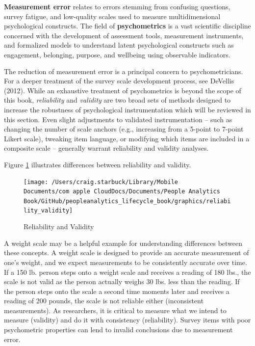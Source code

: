\documentclass[]{book}
\begin{document}
\textbf{Measurement error} relates to errors stemming from confusing questions, survey fatigue, and low-quality scales used to measure multidimensional psychological constructs. The field of \textbf{psychometrics} is a vast scientific discipline concerned with the development of assessment tools, measurement instruments, and formalized models to understand latent psychological constructs such as engagement, belonging, purpose, and wellbeing using observable indicators.

The reduction of measurement error is a principal concern to psychometricians. For a deeper treatment of the survey scale development process, see DeVellis (2012). While an exhaustive treatment of psychometrics is beyond the scope of this book, \emph{reliability} and \emph{validity} are two broad sets of methods designed to increase the robustness of psychological instrumentation which will be reviewed in this section. Even slight adjustments to validated instrumentation -- such as changing the number of scale anchors (e.g., increasing from a 5-point to 7-point Likert scale), tweaking item language, or modifying which items are included in a composite scale -- generally warrant reliability and validity analyses.

Figure \ref{fig:reli-vali} illustrates differences between reliability and validity.

\begin{figure}

{\centering \texttt{[image: /Users/craig.starbuck/Library/Mobile Documents/com~apple~CloudDocs/Documents/People Analytics Book/GitHub/peopleanalytics\_lifecycle\_book/graphics/reliability\_validity]} 

}

\caption{Reliability and Validity}\label{fig:reli-vali}
\end{figure}

A weight scale may be a helpful example for understanding differences between these concepts. A weight scale is designed to provide an accurate measurement of one's weight, and we expect measurements to be consistently accurate over time. If a 150 lb. person steps onto a weight scale and receives a reading of 180 lbs., the scale is not valid as the person actually weighs 30 lbs. less than the reading. If the person steps onto the scale a second time moments later and receives a reading of 200 pounds, the scale is not reliable either (inconsistent measurements). As researchers, it is critical to measure what we intend to measure (validity) and do it with consistency (reliability). Survey items with poor psychometric properties can lend to invalid conclusions due to measurement error.
\end{document}
